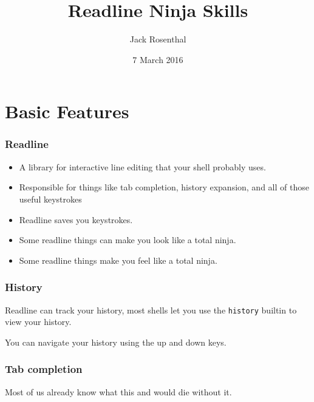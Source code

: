 \documentclass{beamer}
\title{Readline Ninja Skills}
\author{Jack Rosenthal}
\date{7 March 2016}
\begin{document}
\begin{frame}
    \maketitle
\end{frame}
\logo{}

\section{Basic Features}
\begin{frame}
    \frametitle{Readline}
    \begin{itemize}[<+->]
        \item A library for interactive line editing that your shell probably uses.
        \item Responsible for things like tab completion, history expansion,
            and all of those useful keystrokes
        \item Readline saves you keystrokes.
        \item Some readline things can make you look like a total ninja.
        \item Some readline things make you feel like a total ninja.
    \end{itemize}
\end{frame}

\begin{frame}
    \frametitle{History}
    Readline can track your history, most shells let you use the
    \texttt{history} builtin to view your history.

    You can navigate your history using the up and down keys.
\end{frame}

\begin{frame}
    \frametitle{Tab completion}
    Most of us already know what this and would die without it.
\end{frame}
\end{document}
